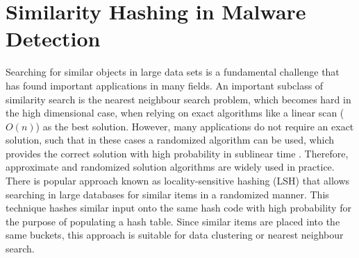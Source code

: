 \documentclass[../../main.tex]{subfiles}
\begin{document}
    
    


\newpage
\section{Similarity Hashing in Malware Detection}


Searching for similar objects in large data sets is a fundamental challenge that has found important applications in many fields. An important subclass of similarity search is the nearest neighbour search problem, which becomes hard in the high dimensional case, when relying on exact algorithms like a linear scan ($O(n)$) as the best solution. However, many applications do not require an exact solution, such that in these cases a randomized algorithm can be used, which provides the correct solution with high probability in sublinear time \cite{datar_locality-sensitive_2004}. Therefore, approximate and randomized solution algorithms are widely used in practice. There is  popular approach known as locality-sensitive hashing (LSH) that allows searching in large databases for similar items in a randomized manner. This technique hashes similar input onto the same hash code with high probability for the purpose of populating a hash table. Since similar items are placed into the same buckets, this approach is suitable for data clustering or nearest neighbour search.
\end{document}
